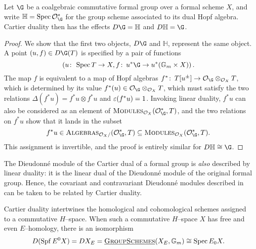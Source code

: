 \begin{lemma}
Let $\G$ be a coalgebraic commutative formal group over a formal scheme $X$, and write $\mathbb H = \Spec \sheaf O_{\G}^*$ for the group scheme associated to its dual Hopf algebra.  Cartier duality then has the effects $D\G = \mathbb H$ and $D\mathbb H = \G$.
\end{lemma}
\begin{proof}
We show that the first two objects, $D\G$ and $\mathbb H$, represent the same object.  A point $(u, f) \in D\G(T)$ is specified by a pair of functions \[\left(u\co \Spec T \to X, f\co u^* \G \to u^*(\Gm \times X)\right).\]  The map $f$ is equivalent to a map of Hopf algebras $f^*\co T[u^\pm] \to \sheaf O_{\G} \otimes_{\sheaf O_X} T$, which is determined by its value $f^*(u) \in \sheaf O_{\G} \otimes_{\sheaf O_X} T$, which must satisfy the two relations $\Delta(f^* u) = f^* u \otimes f^* u$ and $\varepsilon(f^* u) = 1$.  Invoking linear duality, $f^* u$ can also be considered as an element of $\CatOf{Modules}_{\sheaf O_X}(\sheaf O_{\G}^*, T)$, and the two relations on $f^* u$ show that it lands in the subset \[f^* u \in \CatOf{Algebras}_{\sheaf O_X /}(\sheaf O_{\G}^*, T) \subseteq \CatOf{Modules}_{\sheaf O_X}(\sheaf O_{\G}^*, T).\]  This assignment is invertible, and the proof is entirely similar for $D \mathbb H \cong \G$.
\end{proof}

\begin{remark}
The Dieudonn\'e module of the Cartier dual of a formal group is \emph{also} described by linear duality: it is the linear dual of the Dieudonn\'e module of the original formal group.  Hence, the covariant and contravariant Dieudonn\'e modules described in  can be taken to be related by Cartier duality.
\end{remark}

\begin{remark}\label{TopologicalCartierDuality}
Cartier duality intertwines the homological and cohomological schemes assigned to a commutative $H$--space.  When such a commutative $H$--space $X$ has free and even $E$--homology, there is an isomorphism \[D(\operatorname{Spf} E^0 X) = DX_E = \operatorname{\underline{\smash{\normalfont\textsc{GroupSchemes}}}}(X_E, \mathbb G_m) \cong \operatorname{Spec} E_0 X.\]
\end{remark}












